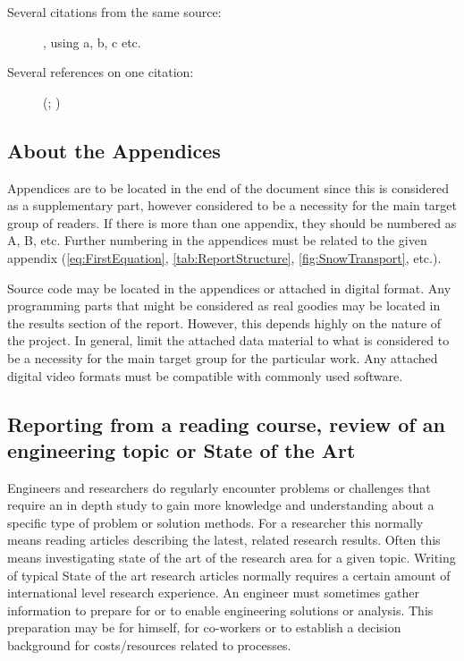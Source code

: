 \documentclass[a4paper,12pt]{extarticle}
\begin{document}
\begin{description}
  \item[Several citations from the same source:] \citet[a]{SINTEF2010}, using a, b, c etc.
\end{description}

\begin{description}
  \item[Several references on one citation:] (\citet{SINTEF2010}; \citet{FlowScienceInc2010})
\end{description}

\subsection{About the Appendices}
Appendices are to be located in the end of the document since this is considered as a supplementary part, however considered to be a necessity for the main target group of readers. If there is more than one appendix, they should be numbered as A, B, etc. Further numbering in the appendices must be related to the given appendix (\cref{eq:FirstEquation}, \cref{tab:ReportStructure}, \cref{fig:SnowTransport}, etc.). 

Source code may be located in the appendices or attached in digital format. Any programming parts that might be considered as real goodies may be located in the results section of the report. However, this depends highly on the nature of the project. In general, limit the attached data material to what is considered to be a necessity for the main target group for the particular work. Any attached digital video formats must be compatible with commonly used software.

\subsection{Reporting from a reading course, review of an engineering topic or State of the Art}
Engineers and researchers do regularly encounter problems or challenges that require an in depth study to gain more knowledge and understanding about a specific type of problem or solution methods. For a researcher this normally means reading articles describing the latest, related research results. Often this means investigating state of the art of the research area for a given topic. Writing of typical State of the art research articles normally requires a certain amount of international level research experience. An engineer must sometimes gather information to prepare for or to enable engineering solutions or analysis. This preparation may be for himself, for co-workers or to establish a decision background for costs/resources related to processes. 
\end{document}
